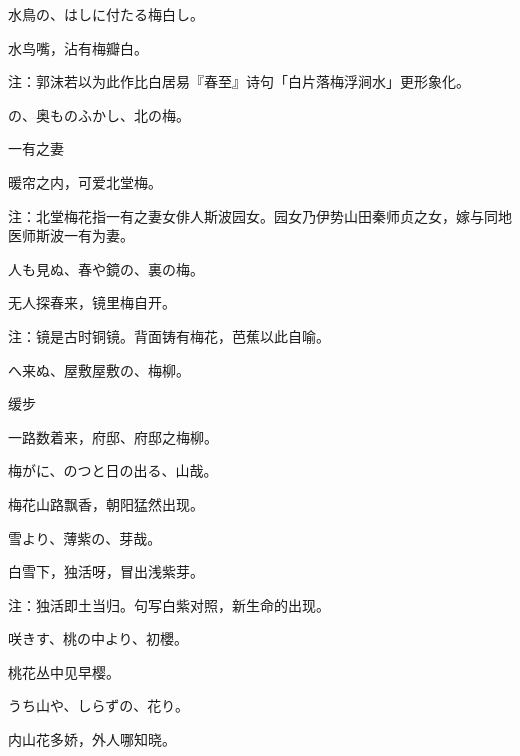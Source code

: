 \begin{haiku}
    {\FH 水鳥の、はしに付たる梅白し。}

    {\FK 水鸟嘴，沾有梅瓣白。}

    {\FT 注：郭沫若以为此作比白居易『春至』诗句「白片落梅浮涧水」更形象化。}
\end{haiku}

\begin{haiku}
    {\FH {}の、奥ものふかし、北の梅。}

    {\FK 一有之妻}

    {\FK 暖帘之内，可爱北堂梅。}

    {\FT 注：北堂梅花指一有之妻女俳人斯波园女。园女乃伊势山田秦师贞之女，嫁与同地医师斯波一有为妻。}
\end{haiku}

\begin{haiku}
    {\FH 人も見ぬ、春や鏡の、裏の梅。}

    {\FK 无人探春来，镜里梅自开。}

    {\FT 注：镜是古时铜镜。背面铸有梅花，芭蕉以此自喻。}
\end{haiku}

\begin{haiku}
    {\FH {}へ来ぬ、屋敷屋敷の、梅柳。}

    {\FK 缓步}

    {\FK 一路数着来，府邸、府邸之梅柳。}
\end{haiku}

\begin{haiku}
    {\FH 梅がに、のつと日の出る、山哉。}

    {\FK 梅花山路飘香，朝阳猛然出现。}
\end{haiku}

\begin{haiku}
    {\FH 雪より、薄紫の、芽哉。}

    {\FK 白雪下，独活呀，冒出浅紫芽。}

    {\FT 注：独活即土当归。句写白紫对照，新生命的出现。}
\end{haiku}

\begin{haiku}
    {\FH 咲きす、桃の中より、初櫻。}

    {\FK 桃花丛中见早樱。}
\end{haiku}

\begin{haiku}
    {\FH うち山や、しらずの、花り。}

    {\FK 内山花多娇，外人哪知晓。}
\end{haiku}

